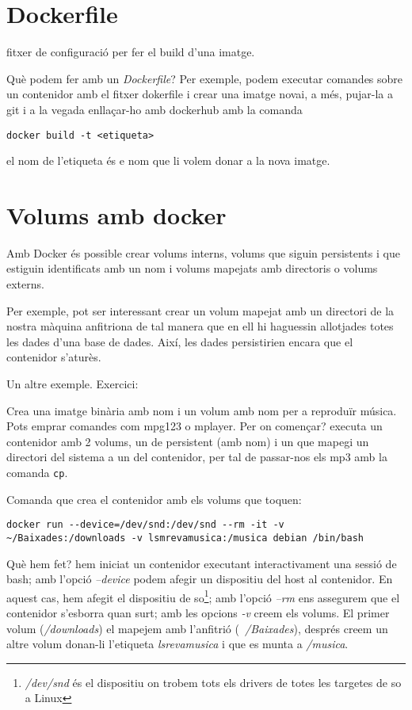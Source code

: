 \documentclass[a4paper]{article}
\begin{document}

\section{Dockerfile}
fitxer de configuració per fer el build d'una imatge.

Què podem fer amb un \textit{Dockerfile}? Per exemple, podem executar comandes sobre un contenidor amb el fitxer dokerfile i crear una imatge novai, a m\'{e}s, pujar-la a git i a la vegada enllaçar-ho amb dockerhub amb la comanda 
\begin{lstlisting}
docker build -t <etiqueta> 
\end{lstlisting}el nom de l'etiqueta \'{e}s e nom que li volem donar a la nova imatge.

\section{Volums amb docker}Amb Docker \'{e}s possible crear volums interns, volums que siguin persistents i que estiguin identificats amb un nom i volums mapejats amb directoris o volums externs. 

Per exemple, pot ser interessant crear un volum mapejat amb un directori de la nostra màquina anfitriona de tal manera que en ell hi haguessin allotjades totes les dades d'una base de dades. Així, les dades persistirien encara que el contenidor s'aturès.

Un altre exemple. Exercici: 

Crea una imatge binària amb nom i un volum amb nom per a reproduïr música. Pots emprar comandes com mpg123 o mplayer. Per on començar? executa un contenidor amb 2 volums, un de persistent (amb nom) i un que mapegi un directori del sistema a un del contenidor, per tal de passar-nos els mp3 amb la comanda \verb+cp+.

Comanda que crea el contenidor amb els volums que toquen:

\begin{lstlisting}
docker run --device=/dev/snd:/dev/snd --rm -it -v ~/Baixades:/downloads -v lsmrevamusica:/musica debian /bin/bash
\end{lstlisting}

Què hem fet? hem iniciat un contenidor executant interactivament una sessió de bash; amb l'opció \textit{--device} podem afegir un dispositiu del host al contenidor. En aquest cas, hem afegit el dispositiu de so\footnote{\textit{/dev/snd} \'{e}s el dispositiu on trobem tots els drivers de totes les targetes de so a Linux}; amb l'opció \textit{--rm} ens assegurem que el contenidor s'esborra quan surt; amb les opcions \textit{-v} creem els volums. El primer volum (\textit{/downloads}) el mapejem amb l’anfitrió (\textit{~/Baixades}), despr\'{e}s creem un altre volum donan-li l'etiqueta \textit{lsrevamusica} i que es munta a \textit{/musica}.
\end{document}

